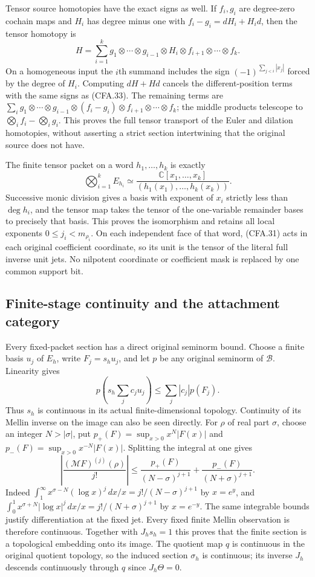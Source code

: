 Tensor source homotopies have the exact signs as well.  If $f_i,g_i$
are degree-zero cochain maps and $H_i$ has degree minus one with
$f_i-g_i=dH_i+H_id$, then the tensor homotopy is
\[
 H=\sum_{i=1}^k
       g_1\otimes\cdots\otimes g_{i-1}\otimes H_i
            \otimes f_{i+1}\otimes\cdots\otimes f_k.         \tag{CFA.34}
\]
On a homogeneous input the $i$th summand includes the sign
$(-1)^{\sum_{j<i}|x_j|}$ forced by the degree of $H_i$.
Computing $dH+Hd$ cancels the different-position terms with the
same signs as (CFA.33).  The remaining terms are
$\sum_i g_1\otimes\cdots\otimes g_{i-1}\otimes(f_i-g_i)
\otimes f_{i+1}\otimes\cdots\otimes f_k$; the middle products
telescope to $\bigotimes_i f_i-\bigotimes_i g_i$.
This proves the full tensor transport of the Euler and dilation
homotopies, without asserting a strict section intertwining that
the original source does not have.

The finite tensor packet on a word $h_1,\ldots,h_k$ is exactly
\[
 \bigotimes_{i=1}^k E_{h_i}
 \simeq\frac{\mathbb C[x_1,\ldots,x_k]}
              {(h_1(x_1),\ldots,h_k(x_k))}.                   \tag{CFA.35}
\]
Successive monic division gives a basis with exponent of $x_i$
strictly less than $\deg h_i$, and the tensor map takes the tensor
of the one-variable remainder bases to precisely that basis.
This proves the isomorphism and retains all local exponents
$0\le j_i<m_{\rho_i}$.  On each independent face of that word,
(CFA.31) acts in each original coefficient coordinate, so its unit
is the tensor of the literal full inverse unit jets.  No nilpotent
coordinate or coefficient mask is replaced by one common support bit.

\subsection{Finite-stage continuity and the attachment category}

Every fixed-packet section has a direct original seminorm bound.
Choose a finite basis $u_j$ of $E_h$, write $F_j=s_hu_j$, and let
$p$ be any original seminorm of $\mathscr B$.  Linearity gives
\[
 p\left(s_h\sum_j c_ju_j\right)
                \le\sum_j|c_j|p(F_j).                       \tag{CFA.36}
\]
Thus $s_h$ is continuous in its actual finite-dimensional topology.
Continuity of its Mellin inverse on the image can also be seen
directly.  For $\rho$ of real part $\sigma$, choose an integer
$N>|\sigma|$, put
$p_+(F)=\sup_{x>0}x^N|F(x)|$ and
$p_-(F)=\sup_{x>0}x^{-N}|F(x)|$.  Splitting the integral at one gives
\[
 \left|\frac{(\mathcal MF)^{(j)}(\rho)}{j!}\right|
 \le\frac{p_+(F)}{(N-\sigma)^{j+1}}
       +\frac{p_-(F)}{(N+\sigma)^{j+1}}.                     \tag{CFA.37}
\]
Indeed $\int_1^\infty x^{\sigma-N}(\log x)^j\,dx/x
=j!/(N-\sigma)^{j+1}$ by $x=e^y$, and
$\int_0^1x^{\sigma+N}|\log x|^j\,dx/x
=j!/(N+\sigma)^{j+1}$ by $x=e^{-y}$.
The same integrable bounds justify differentiation at the fixed
jet.  Every fixed finite Mellin observation is therefore continuous.
Together with $J_hs_h=1$ this proves that the finite section is a
topological embedding onto its image.  The quotient map $q$ is
continuous in the original quotient topology, so the induced section
$\sigma_h$ is continuous; its inverse $J_h$ descends continuously
through $q$ since $J_h\Theta=0$.

